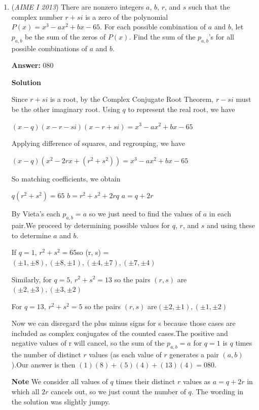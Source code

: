 \begin{enumerate}
 


	\item (\textit{AIME I 2013}) There are nonzero integers $a$, $b$, $r$, and $s$ such that the complex number $r+si$ is a zero of the polynomial $P(x)={x}^{3}-a{x}^{2}+bx-65$. For each possible combination of $a$ and $b$, let ${p}_{a,b}$ be the sum of the zeros of $P(x)$. Find the sum of the ${p}_{a,b}$'s for all possible combinations of $a$ and $b$.


 



 
 \textbf{Answer: }080



\textbf{Solution}

Since $r+si$ is a root, by the Complex Conjugate Root Theorem, $r-si$ must be the other imaginary root. Using $q$ to represent the real root, we have

 $(x-q)(x-r-si)(x-r+si) = x^3 -ax^2 + bx -65$

 Applying difference of squares, and regrouping, we have

 $(x-q)(x^2 - 2rx + (r^2 + s^2)) = x^3 -ax^2 + bx -65$

 So matching coefficients, we obtain

 $q(r^2 + s^2) = 65$
$b = r^2 + s^2 + 2rq$
$a = q + 2r$

 By Vieta's each ${p}_{a,b} = a$ so we just need to find the values of $a$ in each pair.We proceed by determining possible values for $q$, $r$, and $s$ and using these to determine $a$ and $b$.

 If $q = 1$, $r^2 + s^2 = 65$so (r, s) = $(\pm1, \pm 8), (\pm8, \pm 1), (\pm4, \pm 7), (\pm7, \pm 4)$

 Similarly, for $q = 5$, $r^2 + s^2 = 13$ so the pairs $(r,s)$ are$(\pm2, \pm 3), (\pm3, \pm 2)$

 For $q = 13$, $r^2 + s^2 = 5$ so the pairs $(r,s)$ are$(\pm2, \pm 1), (\pm1, \pm 2)$

 Now we can disregard the plus minus signs for s because those cases are included as complex conjugates of the counted cases.The positive and negative values of r will cancel, so the sum of the  ${p}_{a,b} = a$ for $q = 1$ is $q$ times the number of distinct $r$ values (as each value of $r$ generates a pair $(a,b)$).Our answer is then $(1)(8) + (5)(4) + (13)(4) = \boxed{080}$.

 \textbf{Note} We consider all values of $q$ times their distinct $r$ values as $a = q+2r$ in which all $2r$ cancels out, so we just count the number of $q$. The wording in the solution was slightly jumpy.


\end{enumerate}

